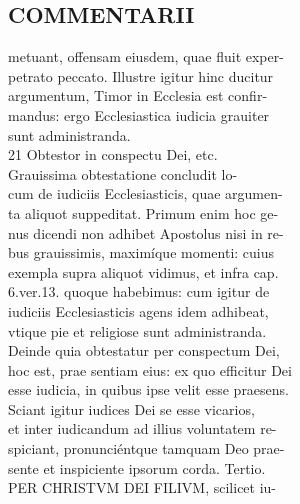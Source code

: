 \documentclass{article}
\begin{document}
\begin{pages}
\section*{COMMENTARII \\
                }
metuant, offensam eiusdem, quae fluit exper- \\
                petrato peccato. Illustre igitur hinc ducitur \\
                argumentum, Timor in Ecclesia est confir- \\
                mandus: ergo Ecclesiastica iudicia grauiter \\
                sunt administranda. \\
                21 Obtestor in conspectu Dei, etc. \\
                Grauissima obtestatione concludit lo- \\
                cum de iudiciis Ecclesiasticis, quae argumen- \\
                ta aliquot suppeditat. Primum enim hoc ge- \\
                nus dicendi non adhibet Apostolus nisi in re- \\
                bus grauissimis, maximíque momenti: cuius \\
                exempla supra aliquot vidimus, et infra cap. \\
                6.ver.13. quoque habebimus: cum igitur de \\
                iudiciis Ecclesiasticis agens idem adhibeat, \\
                vtique pie et religiose sunt administranda. \\
                Deinde quia obtestatur per conspectum Dei, \\
                hoc est, prae sentiam eius: ex quo efficitur Dei \\
                esse iudicia, in quibus ipse velit esse praesens. \\
                Sciant igitur iudices Dei se esse vicarios, \\
                et inter iudicandum ad illius voluntatem re- \\
                spiciant, pronunciéntque tamquam Deo prae- \\
                sente et inspiciente ipsorum corda. Tertio. \\
                PER CHRISTVM DEI FILIVM, scilicet iu- \\

\end{pages}
\end{document}
